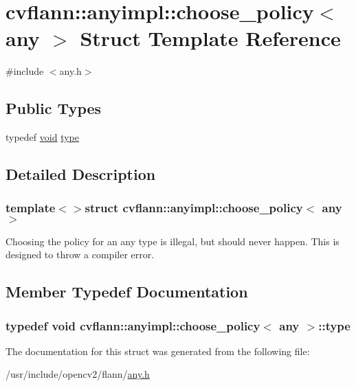 \hypertarget{structcvflann_1_1anyimpl_1_1choose__policy_3_01any_01_4}{\section{cvflann\-:\-:anyimpl\-:\-:choose\-\_\-policy$<$ any $>$ Struct Template Reference}
\label{structcvflann_1_1anyimpl_1_1choose__policy_3_01any_01_4}
}


{\ttfamily \#include $<$any.\-h$>$}

\subsection*{Public Types}
\begin{DoxyCompactItemize}
\item 
typedef \hyperlink{legacy_8hpp_a8bb47f092d473522721002c86c13b94e}{void} \hyperlink{structcvflann_1_1anyimpl_1_1choose__policy_3_01any_01_4_aecb9bad4aa4081b1dfe3ba145524ac52}{type}
\end{DoxyCompactItemize}


\subsection{Detailed Description}
\subsubsection*{template$<$$>$struct cvflann\-::anyimpl\-::choose\-\_\-policy$<$ any $>$}

Choosing the policy for an any type is illegal, but should never happen. This is designed to throw a compiler error. 

\subsection{Member Typedef Documentation}
\hypertarget{structcvflann_1_1anyimpl_1_1choose__policy_3_01any_01_4_aecb9bad4aa4081b1dfe3ba145524ac52}{
\subsubsection[{type}]{\setlength{\rightskip}{0pt plus 5cm}typedef {\bf void} {\bf cvflann\-::anyimpl\-::choose\-\_\-policy}$<$ {\bf any} $>$\-::{\bf type}}}\label{structcvflann_1_1anyimpl_1_1choose__policy_3_01any_01_4_aecb9bad4aa4081b1dfe3ba145524ac52}


The documentation for this struct was generated from the following file\-:\begin{DoxyCompactItemize}
\item 
/usr/include/opencv2/flann/\hyperlink{any_8h}{any.\-h}\end{DoxyCompactItemize}
